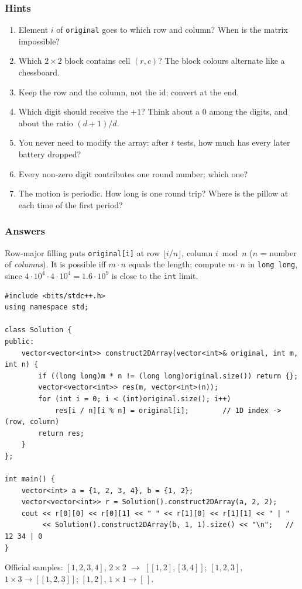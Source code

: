 \subsubsection*{Hints}
\begin{enumerate}[leftmargin=*, label=\textbf{E4.\arabic*}]
    \item Element $i$ of \texttt{original} goes to which row and column? When is the matrix impossible?
    \item Which $2 \times 2$ block contains cell $(r, c)$? The block colours alternate like a chessboard.
    \item Keep the row and the column, not the id; convert at the end.
    \item Which digit should receive the $+1$? Think about a 0 among the digits, and about the ratio $(d+1)/d$.
    \item You never need to modify the array: after $t$ tests, how much has every later battery dropped?
    \item Every non-zero digit contributes one round number; which one?
    \item The motion is periodic. How long is one round trip? Where is the pillow at each time of the first period?
\end{enumerate}

\subsubsection*{Answers}

\begin{solutionbox}
Row-major filling puts \texttt{original[i]} at row $\lfloor i/n \rfloor$, column $i \bmod n$ ($n$ = number of \emph{columns}). It is possible iff $m \cdot n$ equals the length; compute $m \cdot n$ in \texttt{long long}, since $4\cdot10^4 \cdot 4\cdot10^4 = 1.6\cdot10^9$ is close to the \texttt{int} limit.
\begin{lstlisting}[style=cpp]
#include <bits/stdc++.h>
using namespace std;

class Solution {
public:
    vector<vector<int>> construct2DArray(vector<int>& original, int m, int n) {
        if ((long long)m * n != (long long)original.size()) return {};
        vector<vector<int>> res(m, vector<int>(n));
        for (int i = 0; i < (int)original.size(); i++)
            res[i / n][i % n] = original[i];        // 1D index -> (row, column)
        return res;
    }
};

int main() {
    vector<int> a = {1, 2, 3, 4}, b = {1, 2};
    vector<vector<int>> r = Solution().construct2DArray(a, 2, 2);
    cout << r[0][0] << r[0][1] << " " << r[1][0] << r[1][1] << " | "
         << Solution().construct2DArray(b, 1, 1).size() << "\n";   // 12 34 | 0
}
\end{lstlisting}
Official samples: $[1,2,3,4]$, $2 \times 2$ $\to$ $[[1,2],[3,4]]$; $[1,2,3]$, $1 \times 3 \to [[1,2,3]]$; $[1,2]$, $1 \times 1 \to [\,]$.
\end{solutionbox}

